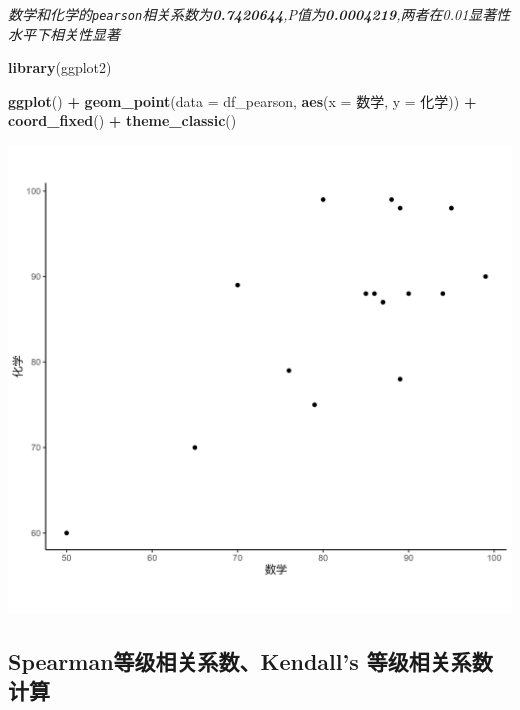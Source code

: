 \documentclass[
]{article}
\newenvironment{Shaded}{\begin{snugshade}}{\end{snugshade}}
\newcommand{\AttributeTok}[1]{\textcolor[rgb]{0.13,0.29,0.53}{#1}}
\newcommand{\FunctionTok}[1]{\textcolor[rgb]{0.13,0.29,0.53}{\textbf{#1}}}
\newcommand{\NormalTok}[1]{#1}
\newcommand{\SpecialCharTok}[1]{\textcolor[rgb]{0.81,0.36,0.00}{\textbf{#1}}}
\begin{document}
\emph{数学和化学的\texttt{pearson}相关系数为\textbf{0.7420644},P值为\textbf{0.0004219},两者在0.01显著性水平下相关性显著}

\begin{Shaded}
\begin{Highlighting}[]
\FunctionTok{library}\NormalTok{(ggplot2)}

\FunctionTok{ggplot}\NormalTok{() }\SpecialCharTok{+}
  \FunctionTok{geom\_point}\NormalTok{(}\AttributeTok{data =}\NormalTok{ df\_pearson,}
             \FunctionTok{aes}\NormalTok{(}\AttributeTok{x =}\NormalTok{ 数学,}
                 \AttributeTok{y =}\NormalTok{ 化学)) }\SpecialCharTok{+}
  \FunctionTok{coord\_fixed}\NormalTok{() }\SpecialCharTok{+}
  \FunctionTok{theme\_classic}\NormalTok{()}
\end{Highlighting}
\end{Shaded}

\begin{center}\includegraphics[width=1\linewidth,height=1\textheight]{exp2_files/figure-latex/cor1.png} \end{center}

\subsection{Spearman等级相关系数、Kendall's
等级相关系数计算}\label{spearmanux7b49ux7ea7ux76f8ux5173ux7cfbux6570kendalls-ux7b49ux7ea7ux76f8ux5173ux7cfbux6570ux8ba1ux7b97}
\end{document}
